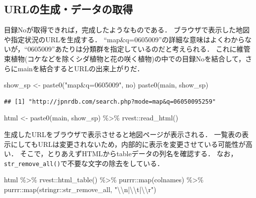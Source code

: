 \documentclass[
]{article}
\newenvironment{Shaded}{\begin{snugshade}}{\end{snugshade}}
\newcommand{\FunctionTok}[1]{\textcolor[rgb]{0.00,0.00,0.00}{#1}}
\newcommand{\NormalTok}[1]{#1}
\newcommand{\OtherTok}[1]{\textcolor[rgb]{0.56,0.35,0.01}{#1}}
\newcommand{\SpecialCharTok}[1]{\textcolor[rgb]{0.00,0.00,0.00}{#1}}
\newcommand{\StringTok}[1]{\textcolor[rgb]{0.31,0.60,0.02}{#1}}
\begin{document}
\hypertarget{urlux306eux751fux6210ux30c7ux30fcux30bfux306eux53d6ux5f97}{%
\subsection{URLの生成・データの取得}\label{urlux306eux751fux6210ux30c7ux30fcux30bfux306eux53d6ux5f97}}

目録Noが取得できれば，完成したようなものである．
ブラウザで表示した地図や指定状況のURLを生成する．
``map\&q=0605009''の詳細な意味はよくわからないが，``0605009''あたりは分類群を指定しているのだと考えられる．
これに維管束植物(コケなどを除くシダ植物と花の咲く植物)の中での目録Noを結合して，さらにmainを結合するとURLの出来上がりだ．

\begin{Shaded}
\begin{Highlighting}[]
\NormalTok{show\_sp }\OtherTok{\textless{}{-}} \FunctionTok{paste0}\NormalTok{(}\StringTok{"map\&q=0605009"}\NormalTok{, no)}
\FunctionTok{paste0}\NormalTok{(main, show\_sp)}
\end{Highlighting}
\end{Shaded}

\begin{verbatim}
## [1] "http://jpnrdb.com/search.php?mode=map&q=06050095259"
\end{verbatim}

\begin{Shaded}
\begin{Highlighting}[]
\NormalTok{html }\OtherTok{\textless{}{-}} 
  \FunctionTok{paste0}\NormalTok{(main, show\_sp) }\SpecialCharTok{\%\textgreater{}\%}
\NormalTok{  rvest}\SpecialCharTok{::}\FunctionTok{read\_html}\NormalTok{()}
\end{Highlighting}
\end{Shaded}

生成したURLをブラウザで表示させると地図ページが表示される．
一覧表の表示にしてもURLは変更されないため，内部的に表示を変更させている可能性が高い．
そこで，とりあえずHTMLからtableデータの列名を確認する．
なお，\texttt{str\_remove\_all()}で不要な文字の除去をしている．

\begin{Shaded}
\begin{Highlighting}[]
\NormalTok{html }\SpecialCharTok{\%\textgreater{}\%}
\NormalTok{  rvest}\SpecialCharTok{::}\FunctionTok{html\_table}\NormalTok{() }\SpecialCharTok{\%\textgreater{}\%}
\NormalTok{  purrr}\SpecialCharTok{::}\FunctionTok{map}\NormalTok{(colnames) }\SpecialCharTok{\%\textgreater{}\%}
\NormalTok{  purrr}\SpecialCharTok{::}\FunctionTok{map}\NormalTok{(stringr}\SpecialCharTok{::}\NormalTok{str\_remove\_all, }\StringTok{"}\SpecialCharTok{\textbackslash{}\textbackslash{}}\StringTok{n|}\SpecialCharTok{\textbackslash{}\textbackslash{}}\StringTok{t|}\SpecialCharTok{\textbackslash{}\textbackslash{}}\StringTok{r"}\NormalTok{)}
\end{Highlighting}
\end{Shaded}
\end{document}

